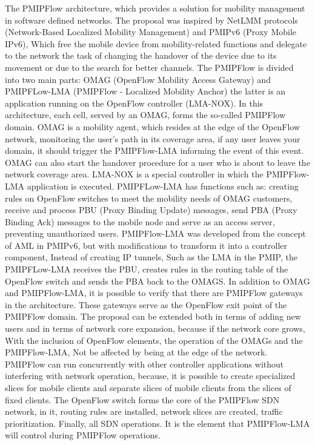 \documentclass[12pt]{article}
\begin{document}
The PMIPFlow architecture, which provides a solution for mobility management in software defined networks. The proposal was inspired by NetLMM protocols (Network-Based Localized Mobility Management) and PMIPv6 (Proxy Mobile IPv6), Which free the mobile device from mobility-related functions and delegate to the network the task of changing the handover of the device due to its movement or due to the search for better channels.
The PMIPFlow is divided into two main parts: OMAG (OpenFlow Mobility Access Gateway) and PMIPFLow-LMA (PMIPFlow - Localized Mobility Anchor) the latter is an application running on the OpenFlow controller (LMA-NOX). In this architecture, each cell, served by an OMAG, forms the so-called PMIPFlow domain. OMAG is a mobility agent, which resides at the edge of the OpenFlow network, monitoring the user's path in its coverage area, if any user leaves your domain, it should trigger the PMIPFlow-LMA informing the event of this event. OMAG can also start the handover procedure for a user who is about to leave the network coverage area.
LMA-NOX is a special controller in which the PMIPFlow-LMA application is executed. PMIPFLow-LMA has functions such as: creating rules on OpenFlow switches to meet the mobility needs of OMAG customers, receive and process PBU (Proxy Binding Update) messages, send PBA (Proxy Binding Ack) messages to the mobile node and serve as an access server, preventing unauthorized users.
PMIPFlow-LMA was developed from the concept of AML in PMIPv6, but with modifications to transform it into a controller component, Instead of creating IP tunnels, Such as the LMA in the PMIP, the PMIPFLow-LMA receives the PBU, creates rules in the routing table of the OpenFlow switch and sends the PBA back to the OMAGS.
In addition to OMAG and PMIPFlow-LMA, it is possible to verify that there are PMIPFlow gateways in the architecture. These gateways serve as the OpenFlow exit point of the PMIPFlow domain. The proposal can be extended both in terms of adding new users and in terms of network core expansion, because if the network core grows, With the inclusion of OpenFlow elements, the operation of the OMAGs and the PMIPFlow-LMA, Not be affected by being at the edge of the network.
PMIPFlow can run concurrently with other controller applications without interfering with network operation, because, it is possible to create specialized slices for mobile clients and separate slices of mobile clients from the slices of fixed clients. The OpenFlow switch forms the core of the PMIPFlow SDN network, in it, routing rules are installed, network slices are created, traffic prioritization. Finally, all SDN operations. It is the element that PMIPFlow-LMA will control during PMIPFlow operations.
\end{document}
